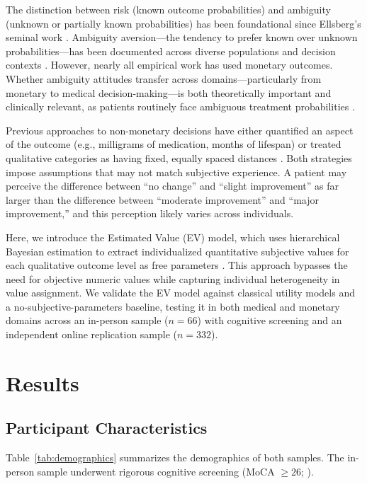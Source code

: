 \documentclass[11pt]{article}
\begin{document}
The distinction between risk (known outcome probabilities) and ambiguity (unknown or partially known probabilities) has been foundational since Ellsberg's seminal work \citep{ellsberg1961risk}. Ambiguity aversion---the tendency to prefer known over unknown probabilities---has been documented across diverse populations and decision contexts \citep{trautmann2015ambiguity, hsu2005neural, huettel2006neural}. However, nearly all empirical work has used monetary outcomes. Whether ambiguity attitudes transfer across domains---particularly from monetary to medical decision-making---is both theoretically important and clinically relevant, as patients routinely face ambiguous treatment probabilities \citep{maffei2022computational}.

Previous approaches to non-monetary decisions have either quantified an aspect of the outcome (e.g., milligrams of medication, months of lifespan) or treated qualitative categories as having fixed, equally spaced distances \citep{blankenstein2017dealing}. Both strategies impose assumptions that may not match subjective experience. A patient may perceive the difference between ``no change'' and ``slight improvement'' as far larger than the difference between ``moderate improvement'' and ``major improvement,'' and this perception likely varies across individuals.

Here, we introduce the Estimated Value (EV) model, which uses hierarchical Bayesian estimation to extract individualized quantitative subjective values for each qualitative outcome level as free parameters \citep{gelman2013bayesian, kruschke2018bayesian}. This approach bypasses the need for objective numeric values while capturing individual heterogeneity in value assignment. We validate the EV model against classical utility models \citep{kahneman1979prospect} and a no-subjective-parameters baseline, testing it in both medical and monetary domains across an in-person sample ($n = 66$) with cognitive screening and an independent online replication sample ($n = 332$).

\section{Results}

\subsection{Participant Characteristics}

Table~\ref{tab:demographics} summarizes the demographics of both samples. The in-person sample underwent rigorous cognitive screening (MoCA $\geq 26$; \citealt{nasreddine2005montreal}).
\end{document}
